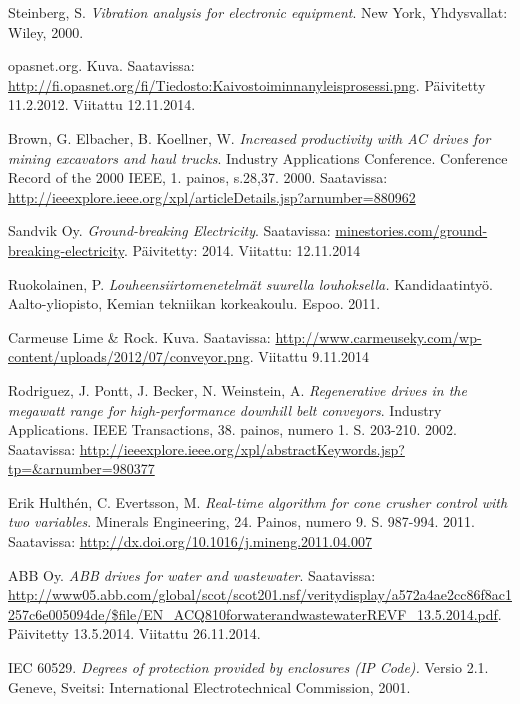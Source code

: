 \documentclass[finnish,12pt,a4paper,pdftex,elec,utf8]{aaltothesis}
\begin{document}
\begin{thebibliography}{99}
Steinberg, S. \textit{Vibration analysis for electronic equipment}. New York, Yhdysvallat: Wiley, 2000.

opasnet.org. Kuva. Saatavissa: \url{http://fi.opasnet.org/fi/Tiedosto:Kaivostoiminnanyleisprosessi.png}. Päivitetty 11.2.2012. Viitattu 12.11.2014.


Brown, G. Elbacher, B. Koellner, W. \textit{Increased productivity with AC drives for mining excavators and haul trucks}. Industry Applications Conference. Conference Record of the 2000 IEEE, 1. painos, s.28,37. 2000. Saatavissa: \url{http://ieeexplore.ieee.org/xpl/articleDetails.jsp?arnumber=880962}

Sandvik Oy. \textit{Ground-breaking Electricity}. Saatavissa: \url{minestories.com/ground-breaking-electricity}. Päivitetty: 2014. Viitattu: 12.11.2014

Ruokolainen, P. \textit{Louheensiirtomenetelmät suurella louhoksella.} Kandidaatintyö. Aalto-yliopisto, Kemian tekniikan korkeakoulu. Espoo. 2011.

Carmeuse Lime \& Rock. Kuva. Saatavissa: \url{http://www.carmeuseky.com/wp-content/uploads/2012/07/conveyor.png}. Viitattu 9.11.2014

Rodriguez, J. Pontt, J. Becker, N. Weinstein, A. \textit{Regenerative drives in the megawatt range for high-performance downhill belt conveyors}. Industry Applications. IEEE Transactions, 38. painos, numero 1. S. 203-210. 2002. Saatavissa: \url{http://ieeexplore.ieee.org/xpl/abstractKeywords.jsp?tp=&arnumber=980377}

Erik Hulthén, C. Evertsson, M. \textit{Real-time algorithm for cone crusher control with two variables}. Minerals Engineering, 24. Painos, numero 9. S. 987-994. 2011.  Saatavissa: \url{http://dx.doi.org/10.1016/j.mineng.2011.04.007}

ABB Oy. \textit{ABB drives for water and wastewater}. Saatavissa: \url{http://www05.abb.com/global/scot/scot201.nsf/veritydisplay/a572a4ae2cc86f8ac1257c6e005094de/$file/EN_ACQ810forwaterandwastewaterREVF_13.5.2014.pdf}. Päivitetty 13.5.2014. Viitattu 26.11.2014.

IEC 60529. \textit{Degrees of protection provided by enclosures (IP Code).} Versio 2.1. Geneve, Sveitsi: International Electrotechnical Commission, 2001.



\end{thebibliography}
\end{document}
